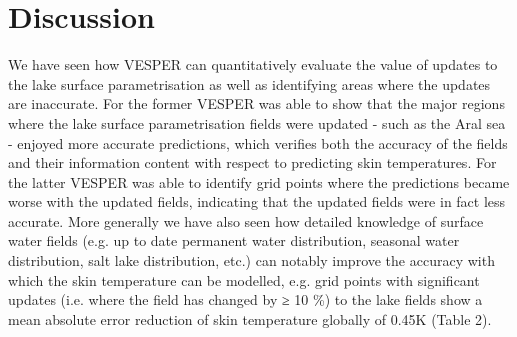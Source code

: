 \documentclass[hess, twostagejnl]{copernicus}
\begin{document}
\section{Discussion} \label{sec:discussion}
We have seen how VESPER can quantitatively evaluate the value of updates to the lake surface parametrisation as well as identifying areas where the updates are inaccurate. For the former VESPER was able to show that the major regions where the lake surface parametrisation fields were updated - such as the Aral sea - enjoyed more accurate predictions, which verifies both the accuracy of the fields and their information content with respect to predicting skin temperatures. For the latter VESPER was able to identify grid points where the predictions became worse with the updated fields, indicating that the updated fields were in fact less accurate. More generally we have also seen how detailed knowledge of surface water fields (e.g. up to date permanent water distribution, seasonal water distribution, salt lake distribution, etc.) can notably improve the accuracy with which the skin temperature can be modelled, e.g. grid points with significant updates (i.e. where the field has changed by ≥ 10 \%) to the lake fields show a mean absolute error reduction of skin temperature globally of 0.45K (Table 2). \newline 
\end{document}
